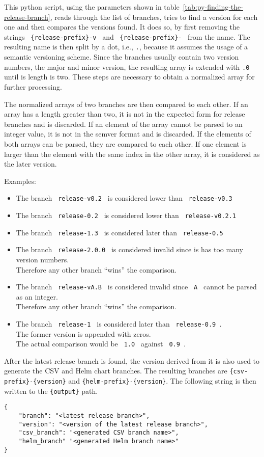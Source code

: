 This python script, using the parameters shown in table~\ref{tab:py-finding-the-release-branch}, reads through the list of branches, tries to find a version for each one and then compares the versions found.
It does so, by first removing the strings \verb| {release-prefix}-v | and \verb| {release-prefix}- | from the name.
The resulting name is then split by a dot, i.e., \verb|.|, because it assumes the usage of a semantic versioning scheme.
Since the branches usually contain two version numbers, the major and minor version, the resulting array is extended with \verb|.0| until is length is two.
These steps are necessary to obtain a normalized array for further processing.

The normalized arrays of two branches are then compared to each other.
If an array has a length greater than two, it is not in the expected form for release branches and is discarded.
If an element of the array cannot be parsed to an integer value, it is not in the semver format and is discarded.
If the elements of both arrays can be parsed, they are compared to each other.
If one element is larger than the element with the same index in the other array, it is considered as the later version.

Examples:
\begin{itemize}
    \item The branch \verb| release-v0.2 | is considered lower than \verb| release-v0.3 |
    \item The branch \verb| release-0.2 |  is considered lower than \verb| release-v0.2.1 |
    \item The branch \verb| release-1.3 | is considered later than \verb| release-0.5 |
    \item The branch \verb| release-2.0.0 | is considered invalid since is has too many version numbers. \\ Therefore any other branch ``wins'' the comparison.
    \item The branch \verb| release-vA.B | is considered invalid since \verb| A | cannot be parsed as an integer. \\ Therefore any other branch ``wins'' the comparison.
    \item The branch \verb| release-1 | is considered later than \verb| release-0.9 |. \\ The former version is appended with zeros. \\ The actual comparison would be \verb| 1.0 | against \verb| 0.9 |.
\end{itemize}

After the latest release branch is found, the version derived from it is also used to generate the CSV and Helm chart branches.
The resulting branches are \verb`{csv-prefix}-{version}` and \verb`{helm-prefix}-{version}`.
The following string is then written to the \verb`{output}` path.

\begin{verbatim}
{
    "branch": "<latest release branch>",
    "version": "<version of the latest release branch>",
    "csv_branch": "<generated CSV branch name>",
    "helm_branch" "<generated Helm branch name>"
}
\end{verbatim}
